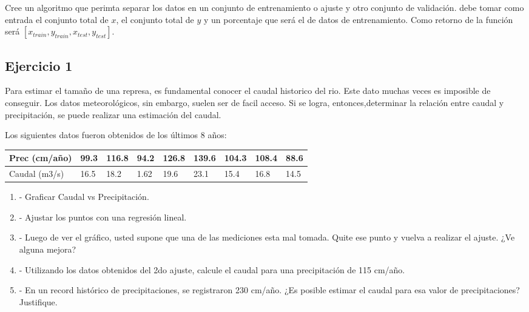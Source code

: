 \documentclass[a4paper,11pt]{article}
\theoremstyle{mytheor}
\begin{document}
\begin{enumerate}[label=\Roman*]
Cree un algoritmo que perimta separar los datos en un conjunto de entrenamiento o ajuste y otro conjunto de validación. debe tomar como entrada el conjunto total de $x$, el conjunto total de $y$ y un porcentaje  que será el de datos de entrenamiento. Como retorno de la función será $[x_{train},y_{train},x_{test},y_{test}]$.



\end{enumerate}

\subsection*{Ejercicio 1}

Para estimar el tamaño de una represa, es fundamental conocer el caudal historico del rio. Este dato muchas veces es imposible de conseguir. Los datos meteorológicos, sin embargo, suelen ser de facil acceso. Si se logra, entonces,determinar la relación entre caudal y precipitación, se puede realizar una estimación del caudal.

Los siguientes datos fueron obtenidos de los últimos 8 años:

\begin{table}[]
\centering
\begin{tabular}{l|llllllll}
 \hline
Prec (cm/año) & 99.3 & 116.8 & 94.2 & 126.8 & 139.6 & 104.3 & 108.4 & 88.6    \\ \hline
Caudal (m3/s) & 16.5 & 18.2  & 1.62 & 19.6  & 23.1  & 15.4  & 16.8  & 14.5    \\ \hline
\end{tabular}
\end{table}

\begin{enumerate}[label=\alph*]
    \item- Graficar Caudal vs Precipitación.
    \item- Ajustar los puntos con una regresión lineal.
    \item- Luego de ver el gráfico, usted supone que una de las mediciones esta mal tomada. Quite ese punto y vuelva a realizar el ajuste. ¿Ve alguna mejora?
    \item- Utilizando los datos obtenidos del 2do ajuste, calcule el caudal para una precipitación de 115 cm/año.
    \item- En un record histórico de precipitaciones, se registraron 230 cm/año. ¿Es posible estimar el caudal para esa valor de precipitaciones? Justifique.
\end{enumerate}
\end{document}
